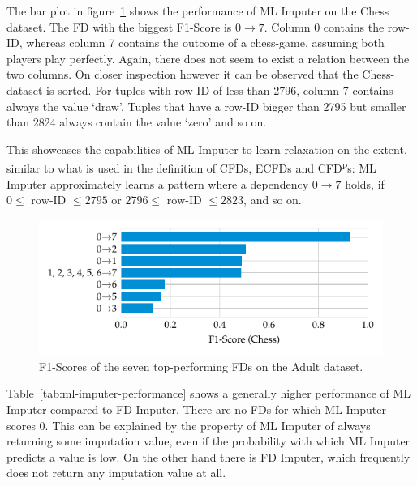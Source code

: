 The bar plot in figure~\ref{fig:f1-ml-imputer-chess} shows the performance of ML Imputer on the Chess dataset.
The FD with the biggest F1-Score is \( 0 \rightarrow 7 \).
Column 0 contains the row-ID, whereas column 7 contains the outcome of a chess-game, assuming both players play perfectly.
Again, there does not seem to exist a relation between the two columns.
On closer inspection however it can be observed that the Chess-dataset is sorted.
For tuples with row-ID of less than 2796, column 7 contains always the value `draw'.
Tuples that have a row-ID bigger than 2795 but smaller than 2824 always contain the value `zero' and so on.

This showcases the capabilities of ML Imputer to learn relaxation on the extent, similar to what is used in the definition of CFDs, ECFDs and CFD\textsuperscript{p}s:
ML Imputer approximately learns a pattern where a dependency \( 0 \rightarrow 7\) holds, if \( 0 \leq \text{ row-ID } \leq 2795 \) or \( 2796 \leq \text{ row-ID } \leq 2823 \), and so on.

\begin{figure}[ht]
     \centering
     \includegraphics[width=\textwidth]{../figures/chess/f1_ml_imputer.pdf}
     \caption{F1-Scores of the seven top-performing FDs on the Adult dataset.}
     \label{fig:f1-ml-imputer-chess}
 \end{figure}

Table~\ref{tab:ml-imputer-performance} shows a generally higher performance of ML Imputer compared to FD Imputer.
There are no FDs for which ML Imputer scores 0.
This can be explained by the property of ML Imputer of always returning some imputation value, even if the probability with which ML Imputer predicts a value is low.
On the other hand there is FD Imputer, which frequently does not return any imputation value at all.

